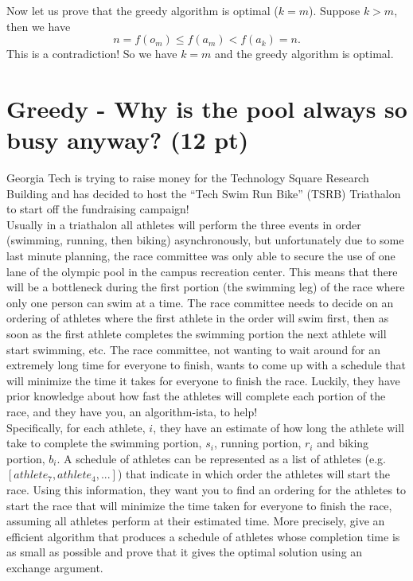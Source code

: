 \documentclass{article}
\begin{document}
\begin{tcolorbox}
Now let us prove that the greedy algorithm is optimal ($k = m$). Suppose $k > m$, then we have $$n = f(o_m) \leq f(a_m) < f(a_k) = n.$$
This is a contradiction! So we have $k = m$ and the greedy algorithm is optimal.

\end{tcolorbox}


\section{Greedy - Why is the pool always so busy anyway? (12 pt)}
	Georgia Tech is trying to raise money for the Technology Square Research Building and has decided to host the ``Tech Swim Run Bike'' (TSRB) Triathalon to start off the fundraising campaign!\\
	
	\noindent Usually in a triathalon all athletes will perform the three events in order (swimming, running, then biking) asynchronously, but unfortunately due to some last minute planning, the race committee was only able to secure the use of one lane of the olympic pool in the campus recreation center. This means that there will be a bottleneck during the first portion (the swimming leg) of the race where only one person can swim at a time. The race committee needs to decide on an ordering of athletes where the first athlete in the order will swim first, then as soon as the first athlete completes the swimming portion the next athlete will start swimming, etc. The race committee, not wanting to wait around for an extremely long time for everyone to finish, wants to come up with a schedule that will minimize the time it takes for everyone to finish the race. Luckily, they have prior knowledge about how fast the athletes will complete each portion of the race, and they have you, an algorithm-ista, to help!\\
	
	\noindent Specifically, for each athlete, $i$, they have an estimate of how long the athlete will take to complete the swimming portion, $s_i$, running portion, $r_i$ and biking portion, $b_i$. A schedule of athletes can be represented as a list of athletes (e.g. $[athlete_7, athlete_4, ...]$) that indicate in which order the athletes will start the race. Using this information, they want you to find an ordering for the athletes to start the race that will minimize the time taken for everyone to finish the race, assuming all athletes perform at their estimated time. More precisely, give an efficient algorithm that produces a schedule of athletes whose completion time is as small as possible and prove that it gives the optimal solution using an exchange argument. \\
	
\end{document}
